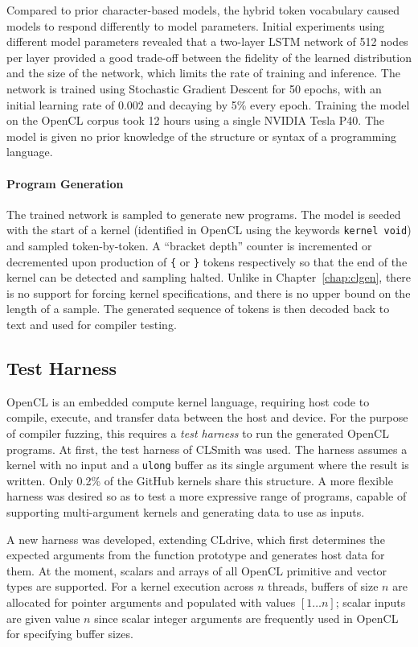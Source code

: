Compared to prior character-based models, the hybrid token vocabulary caused models to respond differently to model parameters. Initial experiments using different model parameters revealed that a two-layer LSTM network of 512 nodes per layer provided a good trade-off between the fidelity of the learned distribution and the size of the network, which limits the rate of training and inference. The network is trained using Stochastic Gradient Descent for 50 epochs, with an initial learning rate of 0.002 and decaying by 5\% every epoch. Training the model on the OpenCL corpus took 12 hours using a single NVIDIA Tesla P40. The model is given no prior knowledge of the structure or syntax of a programming language.

\paragraph*{Program Generation}

The trained network is sampled to generate new programs. The model is seeded with the start of a kernel (identified in OpenCL using the keywords \texttt{kernel void}) and sampled token-by-token. A ``bracket depth'' counter is incremented or decremented upon production of \texttt{\{} or \texttt{\}} tokens respectively so that the end of the kernel can be detected and sampling halted. Unlike in Chapter~\ref{chap:clgen}, there is no support for forcing kernel specifications, and there is no upper bound on the length of a sample. The generated sequence of tokens is then decoded back to text and used for compiler testing.


\subsection{Test Harness\label{sec:test-harness}}

OpenCL is an embedded compute kernel language, requiring host code to compile, execute, and transfer data between the host and device. For the purpose of compiler fuzzing, this requires a \emph{test harness} to run the generated OpenCL programs. At first, the test harness of CLSmith was used. The harness assumes a kernel with no input and a \texttt{ulong} buffer as its single argument where the result is written. Only 0.2\% of the GitHub kernels share this structure. A more flexible harness was desired so as to test a more expressive range of programs, capable of supporting multi-argument kernels and generating data to use as inputs.

A new harness was developed, extending CLdrive, which first determines the expected arguments from the function prototype and generates host data for them. At the moment, scalars and arrays of all OpenCL primitive and vector types are supported. For a kernel execution across $n$ threads, buffers of size $n$ are allocated for pointer arguments and populated with values {$[1 \ldots n]$}; scalar inputs are given value $n$ since scalar integer arguments are frequently used in OpenCL for specifying buffer sizes.

